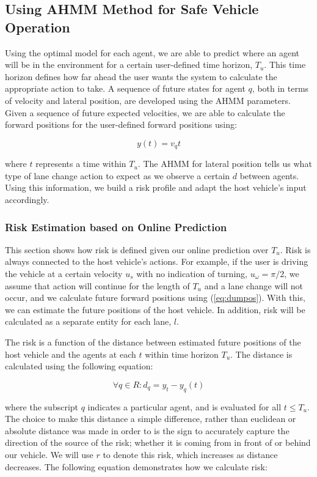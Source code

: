\documentclass[conference]{IEEEtran}
\begin{document}
\subsection{Using AHMM Method for Safe Vehicle Operation}
Using the optimal model for each agent, we are able to predict where an agent will be in the environment for a certain user-defined time horizon, $T_{u}$. This time horizon defines how far ahead the user wants the system to calculate the appropriate action to take.  A sequence of future states for agent $q$, both in terms of velocity and lateral position, are developed using the AHMM parameters. Given a sequence of future expected velocities, we are able to calculate the forward positions for the user-defined forward positions using:

\begin{equation} \label{eq:dumpos}
    y(t) = v_qt
\end{equation}

where $t$ represents a time within $T_{u}$. The AHMM for lateral position tells us what type of lane change action to expect as we observe a certain $d$ between agents. Using this information, we build a risk profile and adapt the host vehicle's input accordingly.


\subsubsection{Risk Estimation based on Online Prediction}
This section shows how risk is defined given our online prediction over $T_{u}$. Risk is always connected to the host vehicle's actions. For example, if the user is driving the vehicle at a certain velocity $u_s$ with no indication of turning, $u_\omega = \pi/2$, we assume that action will continue for the length of $T_{u}$ and a lane change will not occur, and we calculate future forward positions using (\ref{eq:dumpos}). With this, we can estimate the future positions of the host vehicle. In addition, risk will be calculated as a separate entity for each lane, $l$.

The risk is a function of the distance between estimated future positions of the host vehicle and the agents at each $t$ within time horizon $T_{u}$. The distance is calculated using the following equation:

\begin{equation}
    \forall q \in R : d_q = y_t - y_{q}(t)
\end{equation}

where the subscript $q$ indicates a particular agent, and is evaluated for all $t \leq T_u$. The choice to make this distance a simple difference, rather than euclidean or absolute distance was made in order to is the sign to accurately capture the direction of the source of the risk; whether it is coming from in front of or behind our vehicle. We will use $r$ to denote this risk, which increases as distance decreases. The following equation demonstrates how we calculate risk:
\end{document}
